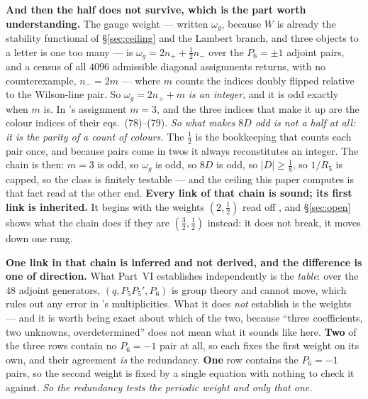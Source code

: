 \documentclass[11pt,a4paper]{article}
\begin{document}
\noindent \textbf{And then the half does not survive, which is the part worth understanding.} The
gauge weight --- written $\omega_g$, because $W$ is already the stability functional of
\S\ref{sec:ceiling} and the Lambert branch, and three objects to a letter is one too many ---
is $\omega_g=2n_++\tfrac12 n_-$ over the $P_6=\pm1$ adjoint pairs, and a census of all
$4096$ admissible diagonal assignments returns, with no counterexample, $n_-=2m$ --- where $m$
counts the indices doubly flipped relative to the Wilson-line pair. So
$\omega_g=2n_++m$ \emph{is an integer}, and it is odd exactly when $m$ is. In \cite{KM25}'s assignment
$m=3$, and the three indices that make it up are the colour indices of their eqs.~(78)--(79).
\emph{So what makes $8D$ odd is not a half at all: it is the parity of a count of colours.} The
$\tfrac12$ is the bookkeeping that counts each pair once, and because pairs come in twos it always
reconstitutes an integer. The chain is then: $m=3$ is odd, so $\omega_g$ is odd, so $8D$ is odd, so
$|D|\ge\tfrac18$, so $1/R_5$ is capped, so the class is finitely testable --- and the ceiling this
paper computes is that fact read at the other end. \textbf{Every link of that chain is sound; its
first link is inherited.} It begins with the weights $(2,\tfrac12)$ read off \cite{KM25}, and
\S\ref{sec:open} shows what the chain does if they are $(\tfrac32,\tfrac12)$ instead: it does not
break, it moves down one rung.

\noindent \textbf{One link in that chain is inferred and not derived, and the difference is one of
direction.} What Part~VI establishes independently is the \emph{table}: over the $48$ adjoint
generators, $(q,P_5P_5',P_6)$ is group theory and cannot move, which rules out any error in
\cite{KM25}'s multiplicities. What it does \emph{not} establish is the weights --- and it is worth
being exact about which of the two, because ``three coefficients, two unknowns, overdetermined''
does not mean what it sounds like here. \textbf{Two} of the three rows contain no $P_6=-1$ pair at
all, so each fixes the first weight on its own, and their agreement \emph{is} the redundancy.
\textbf{One} row contains the $P_6=-1$ pairs, so the second weight is fixed by a single equation
with nothing to check it against. \emph{So the redundancy tests the periodic weight and only that
one.}
\end{document}
